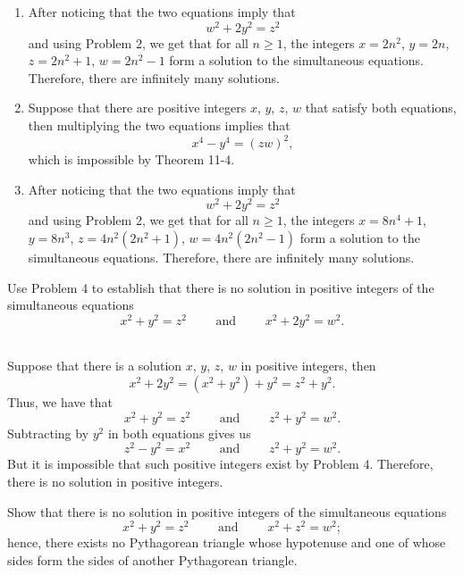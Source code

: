 \begin{solution}
    \begin{enumerate}
        \item After noticing that the two equations imply that
        $$w^2 + 2y^2 = z^2$$
        and using Problem 2, we get that for all $n \geq 1$, the integers $x = 2n^2$, $y = 2n$, $z = 2n^2 + 1$, $w = 2n^2 - 1$ form a solution to the simultaneous equations. Therefore, there are infinitely many solutions.
        \item Suppose that there are positive integers $x$, $y$, $z$, $w$ that satisfy both equations, then multiplying the two equations implies that
        $$x^4 - y^4 = (zw)^2,$$
        which is impossible by Theorem 11-4.
        \item After noticing that the two equations imply that
        $$w^2 + 2y^2 = z^2$$
        and using Problem 2, we get that for all $n \geq 1$, the integers $x = 8n^4 + 1$, $y = 8n^3$, $z = 4n^2(2n^2 + 1)$, $w = 4n^2(2n^2 - 1)$ form a solution to the simultaneous equations. Therefore, there are infinitely many solutions. \\
    \end{enumerate}
\end{solution}

\begin{exercise}
    Use Problem 4 to establish that there is no solution in positive integers of the simultaneous equations 
    $$x^2+y^2 = z^2 \qquad \text{ and } \qquad x^2 + 2y^2 = w^2.$$
     \\
\end{exercise}

\begin{solution}
    Suppose that there is a solution $x$, $y$, $z$, $w$ in positive integers, then
    $$x^2 + 2y^2 = (x^2 + y^2) + y^2 = z^2 + y^2.$$
    Thus, we have that
    $$x^2+y^2 = z^2 \qquad \text{ and } \qquad z^2 + y^2 = w^2.$$
    Subtracting by $y^2$ in both equations gives us 
    $$z^2 - y^2 = x^2 \qquad \text{ and } \qquad z^2 + y^2 = w^2.$$
    But it is impossible that such positive integers exist by Problem 4. Therefore, there is no solution in positive integers. \\
\end{solution}

\begin{exercise}
    Show that there is no solution in positive integers of the simultaneous equations
    $$x^2+y^2 = z^2 \qquad \text{ and } \qquad x^2 + z^2 = w^2;$$
    hence, there exists no Pythagorean triangle whose hypotenuse and one of whose sides form the sides of another Pythagorean triangle.  \\
\end{exercise}

